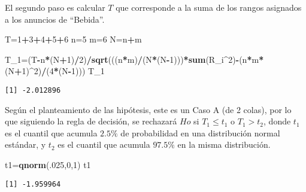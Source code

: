 \documentclass[a4paper,oneside,openany]{book}
\newenvironment{Shaded}{\begin{snugshade}}{\end{snugshade}}
\newcommand{\KeywordTok}[1]{\textcolor[rgb]{0.13,0.29,0.53}{\textbf{#1}}}
\newcommand{\DecValTok}[1]{\textcolor[rgb]{0.00,0.00,0.81}{#1}}
\newcommand{\OperatorTok}[1]{\textcolor[rgb]{0.81,0.36,0.00}{\textbf{#1}}}
\newcommand{\NormalTok}[1]{#1}
\begin{document}
El segundo paso es calcular \(T\) que corresponde a la suma de los
rangos asignados a los anuncios de ``Bebida''.

\begin{Shaded}
\begin{Highlighting}[]
\NormalTok{T=}\DecValTok{1}\OperatorTok{+}\DecValTok{3}\OperatorTok{+}\DecValTok{4}\OperatorTok{+}\DecValTok{5}\OperatorTok{+}\DecValTok{6}
\NormalTok{n=}\DecValTok{5}
\NormalTok{m=}\DecValTok{6}
\NormalTok{N=n}\OperatorTok{+}\NormalTok{m}

\NormalTok{T_}\DecValTok{1}\NormalTok{=(T}\OperatorTok{-}\NormalTok{n}\OperatorTok{*}\NormalTok{(N}\OperatorTok{+}\DecValTok{1}\NormalTok{)}\OperatorTok{/}\DecValTok{2}\NormalTok{)}\OperatorTok{/}\KeywordTok{sqrt}\NormalTok{(((n}\OperatorTok{*}\NormalTok{m)}\OperatorTok{/}\NormalTok{(N}\OperatorTok{*}\NormalTok{(N}\OperatorTok{-}\DecValTok{1}\NormalTok{)))}\OperatorTok{*}\KeywordTok{sum}\NormalTok{(R_i}\OperatorTok{^}\DecValTok{2}\NormalTok{)}\OperatorTok{-}\NormalTok{(n}\OperatorTok{*}\NormalTok{m}\OperatorTok{*}\NormalTok{(N}\OperatorTok{+}\DecValTok{1}\NormalTok{)}\OperatorTok{^}\DecValTok{2}\NormalTok{)}\OperatorTok{/}\NormalTok{(}\DecValTok{4}\OperatorTok{*}\NormalTok{(N}\OperatorTok{-}\DecValTok{1}\NormalTok{)))}
\NormalTok{T_}\DecValTok{1}
\end{Highlighting}
\end{Shaded}

\begin{verbatim}
[1] -2.012896
\end{verbatim}

Según el planteamiento de las hipótesis, este es un Caso A (de 2 colas),
por lo que siguiendo la regla de decisión, se rechazará \(Ho\) si
\(T_1\leq t_1\) o \(T_1> t_2\), donde \(t_1\) es el cuantil que acumula
\(2.5\%\) de probabilidad en una distribución normal estándar, y \(t_2\)
es el cuantil que acumula \(97.5\%\) en la misma distribución.

\begin{Shaded}
\begin{Highlighting}[]
\NormalTok{t1=}\KeywordTok{qnorm}\NormalTok{(.}\DecValTok{025}\NormalTok{,}\DecValTok{0}\NormalTok{,}\DecValTok{1}\NormalTok{)}
\NormalTok{t1}
\end{Highlighting}
\end{Shaded}

\begin{verbatim}
[1] -1.959964
\end{verbatim}
\end{document}
